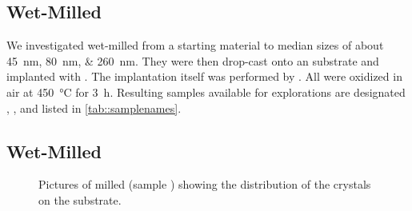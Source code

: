 	\subsection{Wet-Milled \HPHT \Nds}\label{subsec::milled_hpht_nds}
		We investigated \nds wet-milled from a \HPHT starting material to median sizes of about \SIlist{45;80;260}{nm}.
		They were then drop-cast onto an \ir substrate and implanted with  . The implantation itself was performed by \rogalla.
		All \HPHT \nds were oxidized in air at \SI{450}{\celsius} for \SI{3}{\hour}. Resulting samples available for explorations are designated \hphtimpfortyfive, \hphtimpeighty, \hphtimptwosixty and listed in \autoref{tab::samplenames}.

	\subsection{Wet-Milled \CVD \Nds}\label{subsec::milled_nds}

		\begin{figure}[htp]
				\centering
			\caption[Distribution of \nds on-top of an \ir substrate]{Pictures of milled \nds (sample \insituH) showing the distribution of the \nd crystals on the \ir substrate.}
			 \label{fig::sem_millling}
		\end{figure}


